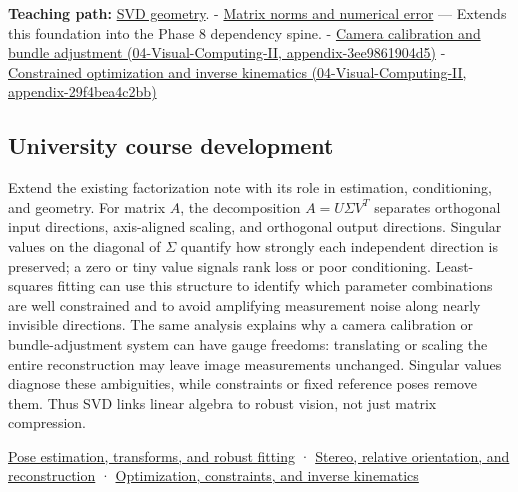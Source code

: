 \textbf{Teaching path:} \href{Continuous\%20Notes/Computing\%20Foundations\%20-\%20From\%20Bits\%20to\%20C++\%20and\%20Systems\%20APIs\#Singular\%20value\%20decomposition\%20covers\%20every\%20rectangular\%20map}{SVD geometry}. - \hyperref[appendix-f8657bac66e5]{Matrix norms and numerical error} --- Extends this foundation into the Phase 8 dependency spine. - \href{}{Camera calibration and bundle adjustment (04-Visual-Computing-II, appendix-3ee9861904d5)} - \href{}{Constrained optimization and inverse kinematics (04-Visual-Computing-II, appendix-29f4bea4c2bb)}

\subsection{University course development}\label{university-course-development}

Extend the existing factorization note with its role in estimation, conditioning, and geometry. For matrix \(A\), the decomposition \(A=U\Sigma V^T\) separates orthogonal input directions, axis-aligned scaling, and orthogonal output directions. Singular values on the diagonal of \(\Sigma\) quantify how strongly each independent direction is preserved; a zero or tiny value signals rank loss or poor conditioning. Least-squares fitting can use this structure to identify which parameter combinations are well constrained and to avoid amplifying measurement noise along nearly invisible directions. The same analysis explains why a camera calibration or bundle-adjustment system can have gauge freedoms: translating or scaling the entire reconstruction may leave image measurements unchanged. Singular values diagnose these ambiguities, while constraints or fixed reference poses remove them. Thus SVD links linear algebra to robust vision, not just matrix compression.

\href{Continuous\%20Notes/University\%20-\%20Worlds,\%20Images\%20and\%20Inference\%20-\%20Graphics,\%20Vision\%20and\%20Photography\#Pose\%20estimation,\%20transforms,\%20and\%20robust\%20fitting}{Pose estimation, transforms, and robust fitting} · \href{Continuous\%20Notes/University\%20-\%20Worlds,\%20Images\%20and\%20Inference\%20-\%20Graphics,\%20Vision\%20and\%20Photography\#Stereo,\%20relative\%20orientation,\%20and\%20reconstruction}{Stereo, relative orientation, and reconstruction} · \href{Continuous\%20Notes/University\%20-\%20Worlds,\%20Images\%20and\%20Inference\%20-\%20Graphics,\%20Vision\%20and\%20Photography\#Optimization,\%20constraints,\%20and\%20inverse\%20kinematics}{Optimization, constraints, and inverse kinematics}
